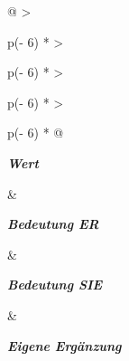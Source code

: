 \begin{longtable}[]{@{}
  >{\raggedright\arraybackslash}p{(\columnwidth - 6\tabcolsep) * }
  >{\raggedright\arraybackslash}p{(\columnwidth - 6\tabcolsep) * }
  >{\raggedright\arraybackslash}p{(\columnwidth - 6\tabcolsep) * }
  >{\raggedright\arraybackslash}p{(\columnwidth - 6\tabcolsep) * }@{}}
\toprule\noalign{}
\begin{minipage}[b]{\linewidth}\raggedright
\emph{\textbf{Wert}}
\end{minipage} \& \begin{minipage}[b]{\linewidth}\raggedright
\emph{\textbf{Bedeutung ER}}
\end{minipage} \& \begin{minipage}[b]{\linewidth}\raggedright
\emph{\textbf{Bedeutung SIE}}
\end{minipage} \& \begin{minipage}[b]{\linewidth}\raggedright
\emph{\textbf{Eigene Ergänzung}}
\end{minipage} \\
\midrule\noalign{}
\endhead
\bottomrule\noalign{}
\endlastfoot

\end{longtable}
